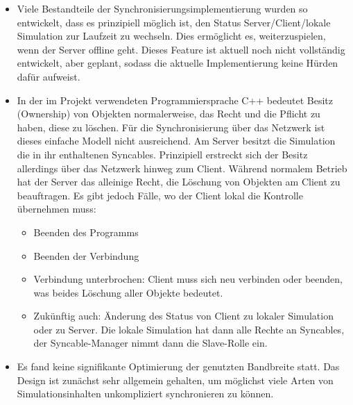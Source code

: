 \begin{itemize}
\item Viele Bestandteile der Synchronisierungsimplementierung wurden so entwickelt, dass es prinzipiell möglich ist, den Status Server/Client/lokale Simulation zur Laufzeit zu wechseln. Dies ermöglicht es, weiterzuspielen, wenn der Server offline geht. Dieses Feature ist aktuell noch nicht vollständig entwickelt, aber geplant, sodass die aktuelle Implementierung keine Hürden dafür aufweist.
\item In der im Projekt verwendeten Programmiersprache C++ bedeutet Besitz (Ownership) von Objekten normalerweise, das Recht und die Pflicht zu haben, diese zu löschen. Für die Synchronisierung über das Netzwerk ist dieses einfache Modell nicht ausreichend. Am Server besitzt die Simulation die in ihr enthaltenen Syncables. Prinzipiell erstreckt sich der Besitz allerdings über das Netzwerk hinweg zum Client. Während normalem Betrieb hat der Server das alleinige Recht, die Löschung von Objekten am Client zu beauftragen. Es gibt jedoch Fälle, wo der Client lokal die Kontrolle übernehmen muss:
\begin{itemize}
\item Beenden des Programms
\item Beenden der Verbindung
\item Verbindung unterbrochen: Client muss sich neu verbinden oder beenden, was beides Löschung aller Objekte bedeutet.
\item Zukünftig auch: Änderung des Status von Client zu lokaler Simulation oder zu Server. Die lokale Simulation hat dann alle Rechte an Syncables, der Syncable-Manager nimmt dann die Slave-Rolle ein.
\end{itemize}
\item Es fand keine signifikante Optimierung der genutzten Bandbreite statt. Das Design ist zunächst sehr allgemein gehalten, um möglichst viele Arten von Simulationsinhalten unkompliziert synchronieren zu können. 
\end{itemize}




